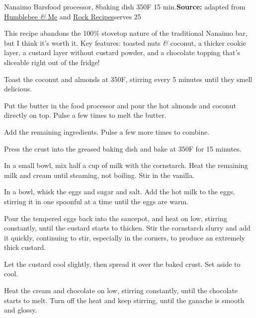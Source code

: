 \begin{recipe}[Nanaimo]{Nanaimo Bars}{food processor, 8\inch{}\inch baking dish \hfill 350\0F \hfill 15 min.}{\textbf{Source:} adapted from \href{https://www.humblebeeandme.com/totally-from-scratch-nanaimo-bars/}{Humblebee \textit{\&} Me} and \href{https://www.rockrecipes.com/chocolate-mint-nanaimo-bars/}{Rock Recipes}\hfill serves 25}

 \freeform This recipe abandons the 100\% stovetop nature of the traditional Nanaimo bar, but I think it's worth it. Key features: toasted nuts \textit{\&} coconut, a thicker cookie layer, a custard layer without custard powder, and a chocolate topping that's sliceable right out of the fridge!

 Toast the coconut and almonds at 350\0F, stirring every 5 minutes until they smell delicious.

 Put the butter in the food processor and pour the hot almonds and coconut directly on top. Pulse a few times to melt the butter.

 Add the remaining ingredients. Pulse a few more times to combine.

 \newstep Press the crust into the greased baking dish and bake at 350\0F for 15 minutes.

 In a small bowl, mix half a cup of milk with the cornstarch. Heat the remaining milk and cream until steaming, not boiling. Stir in the vanilla.

 In a bowl, whisk the eggs and sugar and salt. Add the hot milk to the eggs, stirring it in one spoonful at a time until the eggs are warm.

 \newstep Pour the tempered eggs back into the saucepot, and heat on low, stirring constantly, until the custard starts to thicken. Stir the cornstarch slurry and add it quickly, continuing to stir, especially in the corners, to produce an extremely thick custard.

 \newstep Let the custard cool slightly, then spread it over the baked crust. Set aside to cool.

 Heat the cream and chocolate on low, stirring constantly, until the chocolate starts to melt. Turn off the heat and keep stirring, until the ganache is smooth and glossy.


\end{recipe}
